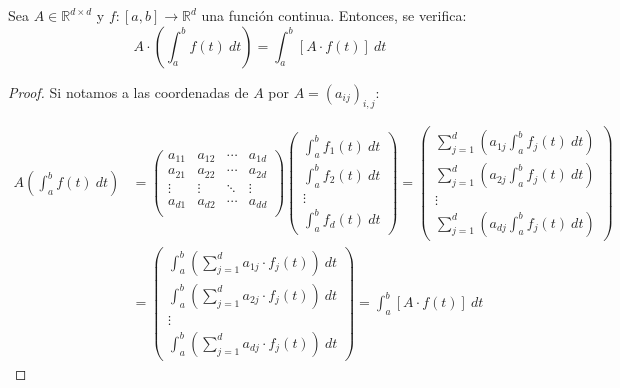 \begin{prop}
    Sea $A\in \mathbb{R}^{d\times d}$ y $f:[a,b]\rightarrow \mathbb{R}^d$ una función continua. Entonces, se verifica:
    \begin{equation*}
        A\cdot \left(\int_{a}^{b} f(t)~dt \right) = \int_{a}^{b} [A\cdot f(t)]~dt
    \end{equation*}
    \begin{proof}
        Si notamos a las coordenadas de $A$ por $A={(a_{ij})}_{i,j}$:

        \begin{align*}
            A \left(\int_{a}^{b} f(t)~dt \right) &= 
            \left(\begin{array}{cccc}
                a_{11} & a_{12} & \cdots & a_{1d} \\
                a_{21} & a_{22} & \cdots & a_{2d} \\
                \vdots & \vdots & \ddots & \vdots \\
                a_{d1} & a_{d2} & \cdots & a_{dd} \\
            \end{array}\right) 
            \left(\begin{array}{c}
                \displaystyle\int_{a}^{b} f_1(t)~dt  \\
                \displaystyle\int_{a}^{b} f_2(t)~dt  \\
                \vdots \\
                \displaystyle\int_{a}^{b} f_d(t)~dt  
            \end{array}\right) = \left(\begin{array}{c}
                \displaystyle\sum_{j=1}^{d} \left(a_{1j}  \int_{a}^{b} f_{j}(t)~dt \right) \\
                \displaystyle\sum_{j=1}^{d} \left(a_{2j}  \int_{a}^{b} f_{j}(t)~dt \right) \\
                \vdots \\
                \displaystyle\sum_{j=1}^{d} \left(a_{dj}  \int_{a}^{b} f_{j}(t)~dt \right) 
            \end{array}\right) \\
                 &= \left(\begin{array}{c}
                     \displaystyle \int_{a}^{b} \left(\sum_{j=1}^{d}a_{1j} \cdot f_j(t)\right)~dt  \\
                     \displaystyle \int_{a}^{b} \left(\sum_{j=1}^{d}a_{2j} \cdot f_j(t)\right)~dt  \\
                     \vdots \\
                     \displaystyle \int_{a}^{b} \left(\sum_{j=1}^{d}a_{dj} \cdot f_j(t)\right)~dt  
             \end{array}\right) = \int_{a}^{b} [A\cdot f(t)]~dt 
        \end{align*}

    \end{proof}
\end{prop}


